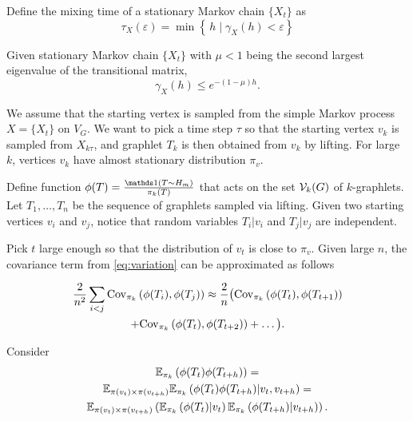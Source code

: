 \begin{definition}
  Define the mixing time of a stationary Markov chain $\{X_t\}$ as
  \begin{equation}
      \tau_X(\varepsilon) = \min\left\{\, h \mid \gamma_X(h) < \varepsilon  \right\}
  \end{equation}
\end{definition}

\begin{theorem}\cite{Sinclair1992}
  Given stationary Markov chain $\{X_t\}$ with $\mu < 1$ being the second largest eigenvalue of the transitional matrix,
  \begin{equation}
      \gamma_X(h) \leq e^{-(1-\mu)h}.
  \end{equation}
\end{theorem}

We assume that the starting vertex is sampled from the simple Markov process $X = \{X_t\}$ on $V_G$.
We want to pick a time step $\tau$ so that the starting vertex $v_k$ is sampled from $X_{k\tau}$, and graphlet $T_k$ is then obtained from $v_k$ by lifting.
For large $k$, vertices $v_k$ have almost stationary distribution $\pi_v$.

Define function $\phi(T) = \frac{\ind(T\sim H_m)}{\pi_k(T)}$ that acts on the set $\mathcal{V}_k(G)$ of $k$-graphlets.
Let $T_1,\ldots,T_n$ be the sequence of graphlets sampled via lifting.
Given two starting vertices $v_i$ and $v_j$, notice that random variables $T_i|v_i$ and $T_j|v_j$ are independent.

Pick $t$ large enough so that the distribution of $v_t$ is close to $\pi_v$.
Given large $n$, the covariance term from \eqref{eq:variation} can be approximated as follows

\begin{multline*}
    \frac{2}{n^2} \sum_{i < j} \mathrm{Cov}_{\pi_k}\left(\phi(T_i), \phi(T_j)\right) \approx
    \frac{2}{n} \big( \mathrm{Cov}_{\pi_k}\left(\phi(T_t), \phi(T_{t+1})\right) \\
    + \mathrm{Cov}_{\pi_k}\left(\phi(T_t), \phi(T_{t+2})\right) + \ldots\big).
\end{multline*}

Consider
\begin{multline*}
    \mathbb{E}_{\pi_k}\left(\phi(T_t) \phi(T_{t+h})\right)=\\
    \mathbb{E}_{\pi(v_t)\times \pi(v_{t+h})} \mathbb{E}_{\pi_k}\left(\phi(T_t) \phi(T_{t+h})| v_t, v_{t+h}\right) =\\
     \mathbb{E}_{\pi(v_t)\times \pi(v_{t+h})} \left(\mathbb{E}_{\pi_k}\left(\phi(T_t)|v_t\right) \mathbb{E}_{\pi_k}\left(\phi(T_{t+h})|v_{t+h}\right)\right).
\end{multline*}

